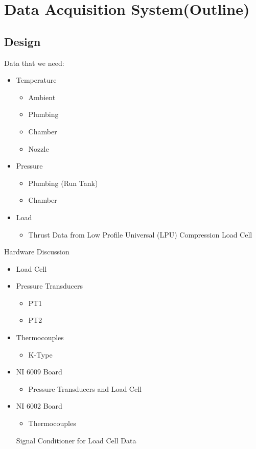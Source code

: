 \documentclass[10pt,a4paper]{article}
\begin{document}
	
\section{Data Acquisition System(Outline)}

\subsection{Design}

Data that we need:
\begin{itemize}
	\item Temperature
	\begin{itemize}
		\item Ambient
		\item Plumbing
		\item Chamber
		\item Nozzle
	\end{itemize}
	\item Pressure
	\begin{itemize}
		\item Plumbing (Run Tank)
		\item Chamber
	\end{itemize}
	\item Load
	\begin{itemize}
		\item Thrust Data from Low Profile Universal (LPU) Compression Load Cell
	\end{itemize}
\end{itemize}

Hardware Discussion
\begin{itemize}
	\item Load Cell
	\item Pressure Transducers
	\begin{itemize}
		\item PT1
		\item PT2
	\end{itemize}
	\item Thermocouples
	\begin{itemize}
		\item K-Type
	\end{itemize}
	\item NI 6009 Board
	\begin{itemize}
		\item Pressure Transducers and Load Cell
	\end{itemize}
	\item NI 6002 Board
	\begin{itemize}
		\item Thermocouples
	\end{itemize}
	Signal Conditioner for Load Cell Data
\end{itemize}
\end{document}
